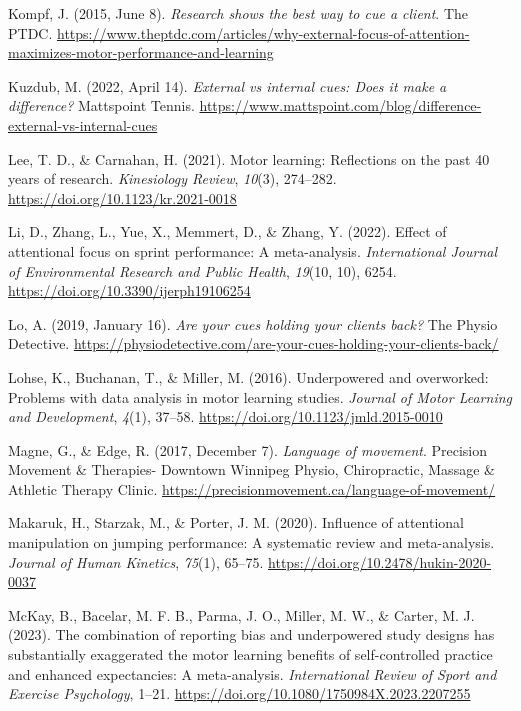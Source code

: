 \documentclass[
  11pt,
  doc, donotrepeattitle,floatsintext]{apa7}
\newlength{\cslhangindent}
\newlength{\cslentryspacingunit} %
\newenvironment{CSLReferences}[2] %
 {%
  \setlength{\parindent}{0pt}
  \ifodd #1
  \let\oldpar\par
  \def\par{\hangindent=\cslhangindent\oldpar}
  \fi
  \setlength{\parskip}{#2\cslentryspacingunit}
 }%
 {}
\begin{document}
\begin{CSLReferences}{1}{0}
\leavevmode{}%
Kompf, J. (2015, June 8). \emph{Research shows the best way to cue a client}. {The PTDC}. \url{https://www.theptdc.com/articles/why-external-focus-of-attention-maximizes-motor-performance-and-learning}

\leavevmode{}%
Kuzdub, M. (2022, April 14). \emph{External vs internal cues: {Does} it make a difference?} {Mattspoint Tennis}. \url{https://www.mattspoint.com/blog/difference-external-vs-internal-cues}

\leavevmode{}%
Lee, T. D., \& Carnahan, H. (2021). Motor learning: {Reflections} on the past 40 years of research. \emph{Kinesiology Review}, \emph{10}(3), 274--282. \url{https://doi.org/10.1123/kr.2021-0018}

\leavevmode{}%
Li, D., Zhang, L., Yue, X., Memmert, D., \& Zhang, Y. (2022). Effect of attentional focus on sprint performance: {A} meta-analysis. \emph{International Journal of Environmental Research and Public Health}, \emph{19}(10, 10), 6254. \url{https://doi.org/10.3390/ijerph19106254}

\leavevmode{}%
Lo, A. (2019, January 16). \emph{Are your cues holding your clients back?} {The Physio Detective}. \url{https://physiodetective.com/are-your-cues-holding-your-clients-back/}

\leavevmode{}%
Lohse, K., Buchanan, T., \& Miller, M. (2016). Underpowered and overworked: {Problems} with data analysis in motor learning studies. \emph{Journal of Motor Learning and Development}, \emph{4}(1), 37--58. \url{https://doi.org/10.1123/jmld.2015-0010}

\leavevmode{}%
Magne, G., \& Edge, R. (2017, December 7). \emph{Language of movement}. {Precision Movement \& Therapies- Downtown Winnipeg Physio, Chiropractic, Massage \& Athletic Therapy Clinic}. \url{https://precisionmovement.ca/language-of-movement/}

\leavevmode{}%
Makaruk, H., Starzak, M., \& Porter, J. M. (2020). Influence of attentional manipulation on jumping performance: {A} systematic review and meta-analysis. \emph{Journal of Human Kinetics}, \emph{75}(1), 65--75. \url{https://doi.org/10.2478/hukin-2020-0037}

\leavevmode{}%
McKay, B., Bacelar, M. F. B., Parma, J. O., Miller, M. W., \& Carter, M. J. (2023). The combination of reporting bias and underpowered study designs has substantially exaggerated the motor learning benefits of self-controlled practice and enhanced expectancies: A meta-analysis. \emph{International Review of Sport and Exercise Psychology}, 1--21. \url{https://doi.org/10.1080/1750984X.2023.2207255}


\end{CSLReferences}
\end{document}
